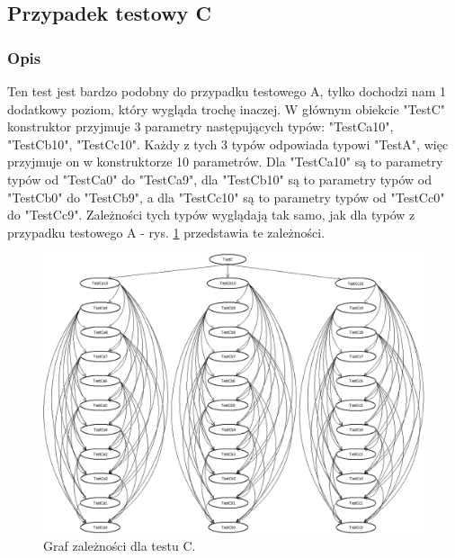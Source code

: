 \documentclass[12pt]{article}
\begin{document}
\subsection{Przypadek testowy C}
\subsubsection{Opis}
Ten test jest bardzo podobny do przypadku testowego A, tylko dochodzi nam 1 dodatkowy poziom, który wygląda trochę inaczej. W głównym obiekcie "TestC" konstruktor przyjmuje 3 parametry następujących typów: "TestCa10", "TestCb10", "TestCc10". Każdy z tych 3 typów odpowiada typowi "TestA", więc przyjmuje on w konstruktorze 10 parametrów. Dla "TestCa10" są to parametry typów od "TestCa0" do "TestCa9", dla "TestCb10" są to parametry typów od "TestCb0" do "TestCb9", a dla "TestCc10" są to parametry typów od "TestCc0" do "TestCc9". Zależności tych typów wyglądają tak samo, jak dla typów z przypadku testowego A - rys. \ref{fig:testC} przedstawia te zależności. \\

\begin{figure}[h]
	\begin{center}
  		\includegraphics[width=\linewidth]{TestC.png}
  		\caption{Graf zależności dla testu C.}
  		\label{fig:testC}
	\end{center}
\end{figure}
\end{document}
